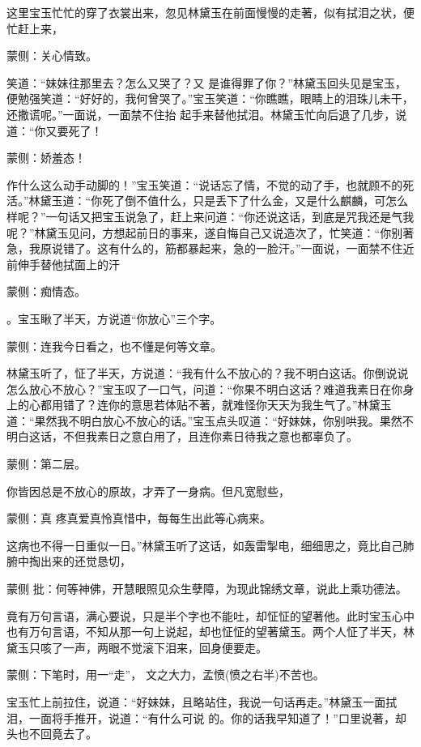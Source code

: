 \begin{parag}
    这里宝玉忙忙的穿了衣裳出来，忽见林黛玉在前面慢慢的走著，似有拭泪之状，便忙赶上来，\begin{note}蒙侧：关心情致。\end{note}笑道：“妹妹往那里去？怎么又哭了？又 是谁得罪了你？”林黛玉回头见是宝玉，便勉强笑道：“好好的，我何曾哭了。”宝玉笑道：“你瞧瞧，眼睛上的泪珠儿未干，还撒谎呢。”一面说，一面禁不住抬 起手来替他拭泪。林黛玉忙向后退了几步，说道：“你又要死了！\begin{note}蒙侧：娇羞态！\end{note}作什么这么动手动脚的！”宝玉笑道：“说话忘了情，不觉的动了手，也就顾不的死活。”林黛玉道：“你死了倒不值什么，只是丢下了什么金，又是什么麒麟，可怎么样呢？”一句话又把宝玉说急了，赶上来问道：“你还说这话，到底是咒我还是气我呢？”林黛玉见问，方想起前日的事来，遂自悔自己又说造次了，忙笑道：“你别著急，我原说错了。这有什么的，筋都暴起来，急的一脸汗。”一面说，一面禁不住近前伸手替他拭面上的汗\begin{note}蒙侧：痴情态。\end{note}。宝玉瞅了半天，方说道“你放心”三个字。\begin{note}蒙侧：连我今日看之，也不懂是何等文章。\end{note}林黛玉听了，怔了半天，方说道：“我有什么不放心的？我不明白这话。你倒说说怎么放心不放心？”宝玉叹了一口气，问道：“你果不明白这话？难道我素日在你身上的心都用错了？连你的意思若体贴不著，就难怪你天天为我生气了。”林黛玉道：“果然我不明白放心不放心的话。”宝玉点头叹道：“好妹妹，你别哄我。果然不 明白这话，不但我素日之意白用了，且连你素日待我之意也都辜负了。\begin{note}蒙侧：第二层。\end{note}你皆因总是不放心的原故，才弄了一身病。但凡宽慰些，\begin{note}蒙侧：真 疼真爱真怜真惜中，每每生出此等心病来。\end{note}这病也不得一日重似一日。”林黛玉听了这话，如轰雷掣电，细细思之，竟比自己肺腑中掏出来的还觉恳切，\begin{note}蒙侧 批：何等神佛，开慧眼照见众生孽障，为现此锦绣文章，说此上乘功德法。\end{note}竟有万句言语，满心要说，只是半个字也不能吐，却怔怔的望著他。此时宝玉心中也有万句言语，不知从那一句上说起，却也怔怔的望著黛玉。两个人怔了半天，林黛玉只咳了一声，两眼不觉滚下泪来，回身便要走。\begin{note}蒙侧：下笔时，用一“走”， 文之大力，孟愤(愤之右半)不苦也。\end{note}宝玉忙上前拉住，说道：“好妹妹，且略站住，我说一句话再走。”林黛玉一面拭泪，一面将手推开，说道：“有什么可说 的。你的话我早知道了！”口里说著，却头也不回竟去了。
\end{parag}


